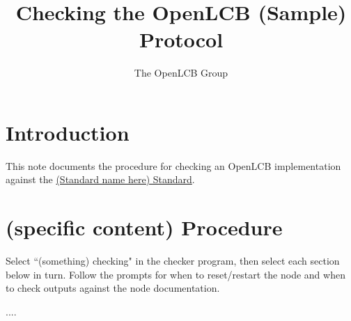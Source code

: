 
\title{Checking the OpenLCB (Sample) Protocol}
\author{The OpenLCB Group}


\maketitle


\section{Introduction}

This note documents the procedure for checking an OpenLCB implementation against the 
\href{url}{(Standard name here) Standard}.



\section{(specific content) Procedure}

Select ``(something) checking" in the checker program, 
then select each section below in turn.  Follow the prompts
for when to reset/restart the node and when to check 
outputs against the node documentation.

....



  
